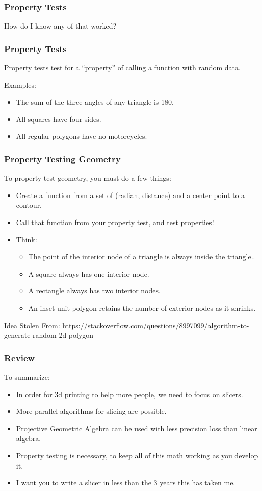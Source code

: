 \documentclass[hyperref={pdfpagemode=FullScreen},aspectratio=169]{beamer}
\begin{document}
\begin{frame}
  \frametitle{Property Tests}
  \Huge{\centerline{How do I know any of that worked?}}
\end{frame}

\begin{frame}
  \frametitle{Property Tests}
  Property tests test for a ``property'' of calling a function with random data.
  \par Examples:
  \normalsize
  \begin{itemize}
    \item The sum of the three angles of any triangle is 180.
    \item All squares have four sides.
    \item All regular polygons have no motorcycles.
  \end{itemize}
\end{frame}

\begin{frame}
  \frametitle{Property Testing Geometry}
  \large To property test geometry, you must do a few things:
  \begin{itemize}
  \item Create a function from a set of (radian, distance) and a center point to a contour.
  \item Call that function from your property test, and test properties!
  \item Think:
    \begin{itemize}
    \item The point of the interior node of a triangle is always inside the triangle..
    \item A square always has one interior node.
    \item A rectangle always has two interior nodes.
    \item An inset unit polygon retains the number of exterior nodes as it shrinks.
    \end{itemize}
  \end{itemize}
  \begin{block}{Idea Stolen From:}
    https://stackoverflow.com/questions/8997099/algorithm-to-generate-random-2d-polygon
  \end{block}
\end{frame}

\begin{frame}
  \frametitle{Review}
  To summarize:
  \begin{itemize}
  \item In order for 3d printing to help more people, we need to focus on slicers.
  \item More parallel algorithms for slicing are possible.
  \item Projective Geometric Algebra can be used with less precision loss than linear algebra.
  \item Property testing is necessary, to keep all of this math working as you develop it.
  \item I want you to write a slicer in less than the 3 years this has taken me.
  \end{itemize}
\end{frame}
\end{document}
